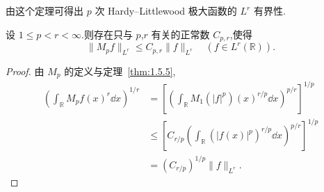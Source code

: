 由这个定理可得出 $p$ 次 Hardy--Littlewood 极大函数的 $L^{r}$ 有界性.

\begin{corollary}\label{cor:1.5.6}
设 $1 \leq p < r < \infty$.则存在只与 $p$,$r$ 有关的正常数 $C_{p,r}$,使得
\begin{equation*}
\| M_{p}f \|_{L^{r}} \leq C_{p,r}\| f \|_{L^{r}} \quad (f \in L^{r}(\mathbb{R})).
\end{equation*}
\end{corollary}

\begin{proof}
由 $M_{p}$ 的定义与定理~\ref{thm:1.5.5},
\begin{align*}
\left(\int_{\mathbb{R}}M_{p}f(x)^{r}\dd x\right)^{1/r} &= \left[\left(\int_{\mathbb{R}}M_{1}(|f|^{p})(x)^{r/p}\dd x\right)^{p/r}\right]^{1/p} \\
&\leq \left[C_{r/p}\left(\int_{\mathbb{R}}\left(|f(x)|^{p}\right)^{r/p}\dd x\right)^{p/r}\right]^{1/p} \\
&= (C_{r/p})^{1/p}\| f \|_{L^{r}}.
\end{align*}
\end{proof}
